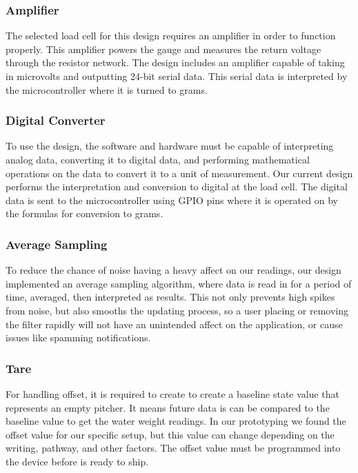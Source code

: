 \subsubsection{Amplifier}
The selected load cell for this design requires an amplifier in order to function properly. This amplifier powers the gauge and measures the return voltage through the resistor network. The design includes an amplifier capable of taking in microvolts and outputting 24-bit serial data. This serial data is interpreted by the microcontroller where it is turned to grams. 

\subsubsection{Digital Converter}
To use the design, the software and hardware must be capable of interpreting analog data, converting it to digital data, and performing mathematical operations on the data to convert it to a unit of measurement. Our current design performs the interpretation and conversion to digital at the load cell. The digital data is sent to the microcontroller using GPIO pins where it is operated on by the formulas for conversion to grams. 

\subsubsection{Average Sampling}
To reduce the chance of noise having a heavy affect on our readings, our design implemented an average sampling algorithm, where data is read in for a period of time, averaged, then interpreted as results. This not only prevents high spikes from noise, but also smooths the updating process, so a user placing or removing the filter rapidly will not have an unintended affect on the application, or cause issues like spamming notifications. 

\subsubsection{Tare}
For handling offset, it is required to create to create a baseline state value that represents an empty pitcher. It means future data is can be compared to the baseline value to get the water weight readings. In our prototyping we found the offset value for our specific setup, but this value can change depending on the writing, pathway, and other factors. The offset value must be programmed into the device before is ready to ship. 
